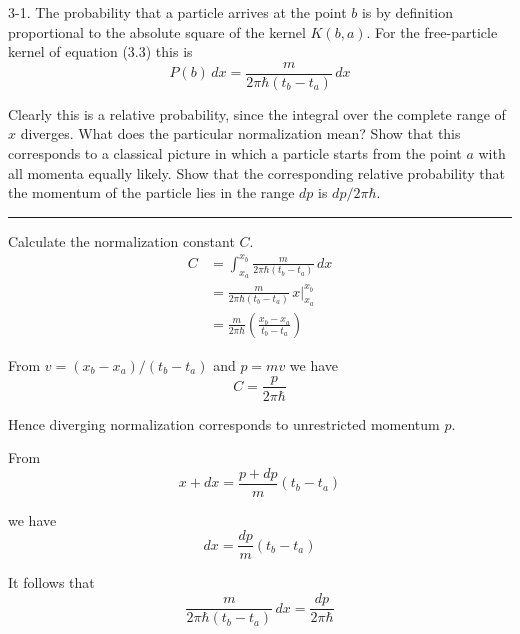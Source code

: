 \documentclass[12pt]{article}
\begin{document}
3-1.
The probability that a particle arrives at the point $b$
is by definition proportional to the absolute square of the kernel
$K(b,a)$.
For the free-particle kernel of equation (3.3) this is
\begin{equation*}
P(b)\,dx=\frac{m}{2\pi\hbar(t_b-t_a)}\,dx
\tag{3.6}
\end{equation*}

Clearly this is a relative probability, since the integral over the
complete range of $x$ diverges.
What does the particular normalization mean?
Show that this corresponds to a classical picture in which a particle
starts from the point $a$ with all momenta equally likely.
Show that the corresponding relative probability that the momentum
of the particle lies in the range $dp$ is $dp/2\pi\hbar$.

\bigskip
\hrule

\bigskip
Calculate the normalization constant $C$.
\begin{align*}
C&=\int_{x_a}^{x_b}\frac{m}{2\pi\hbar(t_b-t_a)}\,dx
\\[1ex]
&=\frac{m}{2\pi\hbar(t_b-t_a)}\,x\bigg|_{x_a}^{x_b}
\\[1ex]
&=\frac{m}{2\pi\hbar}\left(\frac{x_b-x_a}{t_b-t_a}\right)
\end{align*}

From $v=(x_b-x_a)/(t_b-t_a)$ and $p=mv$ we have
\begin{equation*}
C=\frac{p}{2\pi\hbar}
\end{equation*}

\noindent
Hence diverging normalization corresponds to unrestricted momentum $p$.

\bigskip
\noindent
From
\begin{equation*}
x+dx=\frac{p+dp}{m}(t_b-t_a)
\end{equation*}

\noindent
we have
\begin{equation*}
dx=\frac{dp}{m}(t_b-t_a)
\end{equation*}

\noindent
It follows that
\begin{equation*}
\frac{m}{2\pi\hbar(t_b-t_a)}\,dx=\frac{dp}{2\pi\hbar}
\end{equation*}
\end{document}
